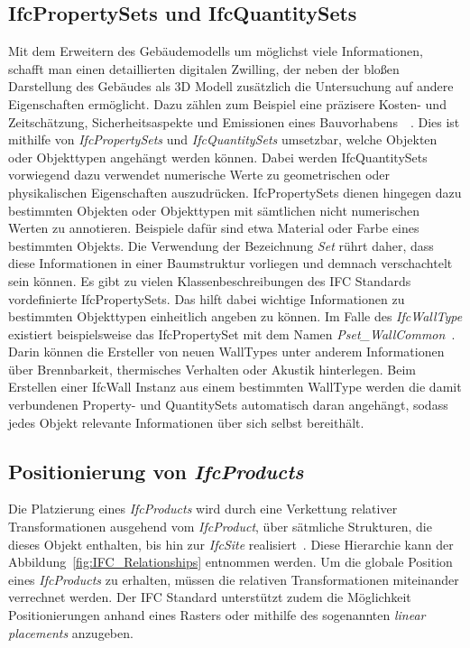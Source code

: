 \subsection{IfcPropertySets und IfcQuantitySets}\label{basics:ifc_properties}
Mit dem Erweitern des Gebäudemodells um möglichst viele Informationen, schafft man einen detaillierten digitalen Zwilling, der neben der bloßen Darstellung des Gebäudes als 3D Modell zusätzlich die Untersuchung auf andere Eigenschaften ermöglicht.
Dazu zählen zum Beispiel eine präzisere Kosten- und Zeitschätzung, Sicherheitsaspekte und Emissionen eines Bauvorhabens~\cite{Industry93:online}~\cite{Ding2014}. 
Dies ist mithilfe von \textit{IfcPropertySets} und \textit{IfcQuantitySets} umsetzbar, welche Objekten oder Objekttypen angehängt werden können.
Dabei werden IfcQuantitySets vorwiegend dazu verwendet numerische Werte zu geometrischen oder physikalischen Eigenschaften auszudrücken.
IfcPropertySets dienen hingegen dazu bestimmten Objekten oder Objekttypen mit sämtlichen nicht numerischen Werten zu annotieren.
Beispiele dafür sind etwa Material oder Farbe eines bestimmten Objekts.
Die Verwendung der Bezeichnung \textit{Set} rührt daher, dass diese Informationen in einer Baumstruktur vorliegen und demnach verschachtelt sein können.
Es gibt zu vielen Klassenbeschreibungen des IFC Standards vordefinierte IfcPropertySets.
Das hilft dabei wichtige Informationen zu bestimmten Objekttypen einheitlich angeben zu können.
Im Falle des \textit{IfcWallType} existiert beispielsweise das IfcPropertySet mit dem Namen \textit{Pset\_WallCommon}~\cite{IFC4310PSetWallCommon:online}.
Darin können die Ersteller von neuen WallTypes unter anderem Informationen über Brennbarkeit, thermisches Verhalten oder Akustik hinterlegen.
Beim Erstellen einer IfcWall Instanz aus einem bestimmten WallType werden die damit verbundenen Property- und QuantitySets automatisch daran angehängt, sodass jedes Objekt relevante Informationen über sich selbst bereithält.

\subsection{Positionierung von \textit{IfcProducts}}
Die Platzierung eines \textit{IfcProducts} wird durch eine Verkettung relativer Transformationen ausgehend vom \textit{IfcProduct}, über sätmliche Strukturen, die dieses Objekt enthalten, bis hin zur \textit{IfcSite} realisiert~\cite{IFCPlatzierung}.
Diese Hierarchie kann der Abbildung~\ref{fig:IFC_Relationships} entnommen werden.
Um die globale Position eines \textit{IfcProducts} zu erhalten, müssen die relativen Transformationen miteinander verrechnet werden.
Der IFC Standard unterstützt zudem die Möglichkeit Positionierungen anhand eines Rasters oder mithilfe des sogenannten \textit{linear placements} anzugeben.

